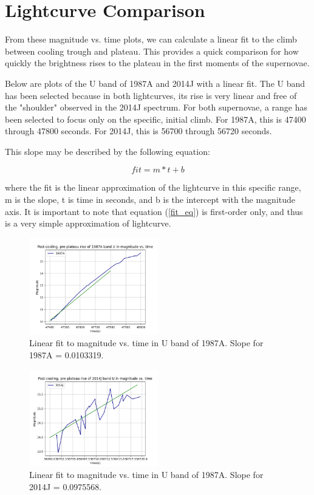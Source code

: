 \section{Lightcurve Comparison}

From these magnitude vs. time plots, we can calculate a linear fit to the climb between cooling trough and plateau. This provides a quick comparison for how quickly the brightness rises to the plateau in the first moments of the supernovae.

Below are plots of the U band of 1987A and 2014J with a linear fit. The U band has been selected because in both lightcurves, its rise is very linear and free of the "shoulder" observed in the 2014J spectrum. For both supernovae, a range has been selected to focus only on the specific, initial climb. For 1987A, this is 47400 through 47800 seconds. For 2014J, this is 56700 through 56720 seconds.

This slope may be described by the following equation:

\begin{equation}\label{fit_eq}
fit = m*t + b
\end{equation}

where the fit is the linear approximation of the lightcurve in this specific range, m is the slope, t is time in seconds, and b is the intercept with the magnitude axis. It is important to note that equation (\ref{fit_eq}) is first-order only, and thus is a very simple approximation of lightcurve.

\begin{figure}[htp]
	\includegraphics[width=0.5\textwidth]{1987A_U_linear.png}
	\caption{Linear fit to magnitude vs. time in U band of 1987A. Slope for 1987A = 0.0103319.}
\end{figure}

\begin{figure}[htp]
	\includegraphics[width=0.5\textwidth]{2014J_U_linear.png}
	\caption{Linear fit to magnitude vs. time in U band of 1987A. Slope for 2014J = 0.0975568.}
\end{figure}

